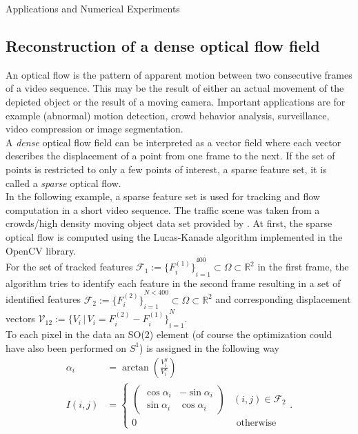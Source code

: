 \begin{chapter}{Applications and Numerical Experiments}
\FloatBarrier
\subsection{Reconstruction of a dense optical flow field} %
\label{sub:reconstructionDenseOpticalFlow}
An optical flow is the pattern of apparent motion between two consecutive frames of a video sequence. This may be the result of either an actual movement of the depicted object
or the result of a moving camera. Important applications are for example (abnormal) motion detection, crowd behavior analysis, surveillance, video compression or image segmentation.\\
A \emph{dense} optical flow field can be interpreted as a vector field where each vector describes the displacement of a point from one frame to the next. If
the set of points is restricted to only a few points of interest, a sparse feature set, it is called a \emph{sparse} optical flow.\\

In the following example, a sparse feature set is used for tracking and flow computation in a short video sequence. The traffic scene was taken from a crowds/high density moving object data 
set provided by \cite{AliShah}. At first, the sparse optical flow is computed using the Lucas-Kanade algorithm \cite{LucasKanade} implemented in the OpenCV library. \\
For the set of tracked features 
$\mathcal{F}_1:=\lbrace{F^{(1)}_i\rbrace}_{i=1}^{400}\subset\Omega\subset\mathbb{R}^2$ in the first frame, the algorithm tries to identify each feature in the second frame resulting in a set of
identified features $\mathcal{F}_2:=\lbrace{F^{(2)}_i\rbrace}_{i=1}^{N<400}\subset\Omega\subset\mathbb{R}^2$ and corresponding displacement vectors 
$\mathcal{V}_{12}:=\lbrace{V_i\,|\,V_i=F_i^{(2)}-F_i^{(1)}\rbrace}_{i=1}^{N}$.\\

To each pixel in the data an SO(2) element (of course the optimization could have also been performed on $S^1$)  is assigned in the following way
\begin{align}
    \alpha_i &=\arctan\left(\frac{V^y_i}{V^x_i}\right) \\
    I(i,j) &= 
    \begin{cases}
    	\begin{pmatrix}
	    \cos\alpha_i    & -\sin\alpha_i\\
	    \sin\alpha_i    & \cos\alpha_i
	\end{pmatrix} & (i,j)\in \mathcal{F}_{2} \\
	0 & \text{ otherwise}
    \end{cases}.
\end{align}



\end{chapter}

